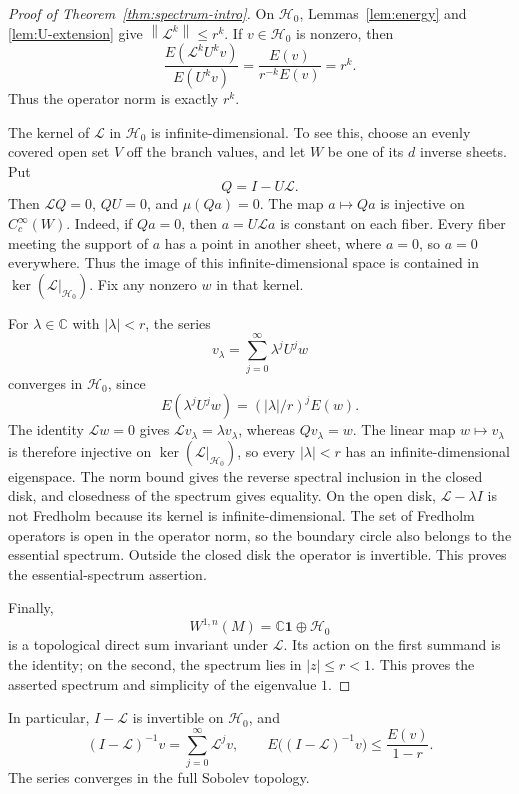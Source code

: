 \documentclass[10pt,a4paper]{amsart}
\newcommand{\C}{\mathbb C}
\newcommand{\Lop}{\mathcal L}
\newcommand{\Hcal}{\mathcal H}
\newcommand{\norm}[1]{\left\lVert #1\right\rVert}
\numberwithin{equation}{section}
\begin{document}
\begin{proof}[Proof of Theorem~\ref{thm:spectrum-intro}]
On $\Hcal_0$, Lemmas~\ref{lem:energy} and \ref{lem:U-extension} give $\norm{\Lop^k}\le r^k$. If $v\in\Hcal_0$ is nonzero, then
\[
 \frac{E(\Lop^kU^kv)}{E(U^kv)}
 =\frac{E(v)}{r^{-k}E(v)}=r^k.
\]
Thus the operator norm is exactly $r^k$.

The kernel of $\Lop$ in $\Hcal_0$ is infinite-dimensional. To see this, choose an evenly covered open set $V$ off the branch values, and let $W$ be one of its $d$ inverse sheets. Put
\[
 Q=I-U\Lop.
\]
Then $\Lop Q=0$, $QU=0$, and $\mu(Qa)=0$. The map $a\mapsto Qa$ is injective on $C_c^\infty(W)$. Indeed, if $Qa=0$, then $a=U\Lop a$ is constant on each fiber. Every fiber meeting the support of $a$ has a point in another sheet, where $a=0$, so $a=0$ everywhere. Thus the image of this infinite-dimensional space is contained in $\ker(\Lop|_{\Hcal_0})$. Fix any nonzero $w$ in that kernel.

For $\lambda\in\C$ with $|\lambda|<r$, the series
\begin{equation}\label{eq:eigenvector-series}
 v_\lambda=\sum_{j=0}^{\infty}\lambda^jU^jw
\end{equation}
converges in $\Hcal_0$, since
\[
 E(\lambda^jU^jw)=(|\lambda|/r)^jE(w).
\]
The identity $\Lop w=0$ gives $\Lop v_\lambda=\lambda v_\lambda$, whereas $Qv_\lambda=w$. The linear map $w\mapsto v_\lambda$ is therefore injective on $\ker(\Lop|_{\Hcal_0})$, so every $|\lambda|<r$ has an infinite-dimensional eigenspace. The norm bound gives the reverse spectral inclusion in the closed disk, and closedness of the spectrum gives equality. On the open disk, $\Lop-\lambda I$ is not Fredholm because its kernel is infinite-dimensional. The set of Fredholm operators is open in the operator norm, so the boundary circle also belongs to the essential spectrum. Outside the closed disk the operator is invertible. This proves the essential-spectrum assertion.

Finally,
\[
 W^{1,n}(M)=\C\mathbf1\oplus\Hcal_0
\]
is a topological direct sum invariant under $\Lop$. Its action on the first summand is the identity; on the second, the spectrum lies in $|z|\le r<1$. This proves the asserted spectrum and simplicity of the eigenvalue $1$.
\end{proof}

In particular, $I-\Lop$ is invertible on $\Hcal_0$, and
\begin{equation}\label{eq:resolvent}
 (I-\Lop)^{-1}v=\sum_{j=0}^{\infty}\Lop^jv,
 \qquad
 E\big((I-\Lop)^{-1}v\big)\le\frac{E(v)}{1-r}.
\end{equation}
The series converges in the full Sobolev topology.
\end{document}
